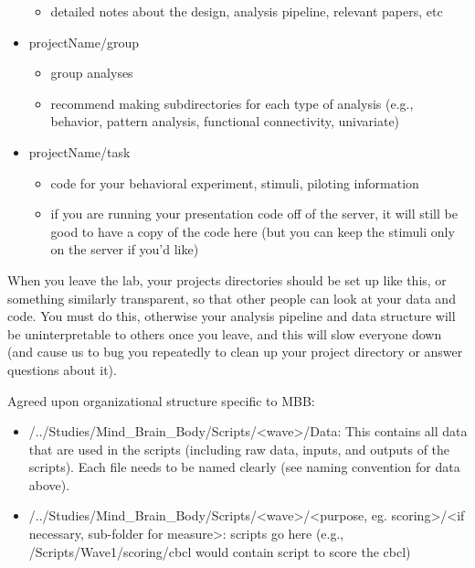 \documentclass[]{book}
\providecommand{\tightlist}{%
  \setlength{\itemsep}{0pt}\setlength{\parskip}{0pt}}
\begin{document}
\begin{itemize}
  \begin{itemize}
  \tightlist
  \item
    detailed notes about the design, analysis pipeline, relevant papers,
    etc
  \end{itemize}
\item
  projectName/group

  \begin{itemize}
  \tightlist
  \item
    group analyses
  \item
    recommend making subdirectories for each type of analysis (e.g.,
    behavior, pattern analysis, functional connectivity, univariate)
  \end{itemize}
\item
  projectName/task

  \begin{itemize}
  \tightlist
  \item
    code for your behavioral experiment, stimuli, piloting information
  \item
    if you are running your presentation code off of the server, it will
    still be good to have a copy of the code here (but you can keep the
    stimuli only on the server if you'd like)
  \end{itemize}
\end{itemize}

When you leave the lab, your projects directories should be set up like
this, or something similarly transparent, so that other people can look
at your data and code. You must do this, otherwise your analysis
pipeline and data structure will be uninterpretable to others once you
leave, and this will slow everyone down (and cause us to bug you
repeatedly to clean up your project directory or answer questions about
it).

Agreed upon organizational structure specific to MBB:

\begin{itemize}
\tightlist
\item
  /../Studies/Mind\_Brain\_Body/Scripts/\textless{}wave\textgreater{}/Data:
  This contains all data that are used in the scripts (including raw
  data, inputs, and outputs of the scripts). Each file needs to be named
  clearly (see naming convention for data above).
\item
  /../Studies/Mind\_Brain\_Body/Scripts/\textless{}wave\textgreater{}/\textless{}purpose,
  eg. scoring\textgreater{}/\textless{}if necessary, sub-folder for
  measure\textgreater{}: scripts go here (e.g.,
  /Scripts/Wave1/scoring/cbcl would contain script to score the cbcl)
\end{itemize}
\end{document}
